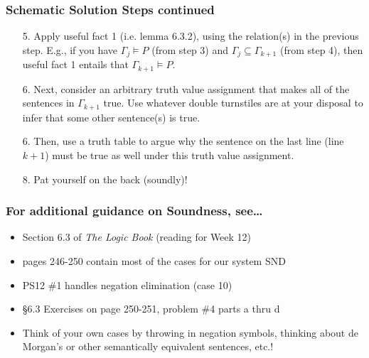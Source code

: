 \begin{frame}
\frametitle{Schematic Solution Steps continued}

\begin{enumerate}[<+->]

\small

\item[5.] Apply useful fact 1 (i.e. lemma 6.3.2), using the relation(s) in the previous step. E.g., if you have $\Gamma_j \vDash P$ (from step 3) and $\Gamma_j \subseteq \Gamma_{k +1} $ (from step 4), then useful fact 1 entails that $\Gamma_{k +1} \vDash P$.

\item[6.] Next, consider an arbitrary truth value assignment that makes all of the sentences in $\Gamma_{k +1} $ true. Use whatever double turnstiles are at your disposal to infer that some other sentence(s) is true. 

\item[6.] Then, use a truth table to argue why the sentence on the last line (line $k +1$) must be true as well under this truth value assignment.

\item[8.] Pat yourself on the back (soundly)!

\end{enumerate}

\end{frame}

\begin{frame}
\frametitle{For additional guidance on Soundness, see\dots}

\begin{itemize}

\item Section 6.3 of \textit{The Logic Book} (reading for Week 12)

\item pages 246-250 contain most of the cases for our system SND

\item PS12 \#1 handles negation elimination (case 10)

\item \S6.3 Exercises on page 250-251, problem \#4 parts a thru d

\item Think of your own cases by throwing in negation symbols, thinking about de Morgan's or other semantically equivalent sentences, etc.! 

\end{itemize}
\end{frame}

